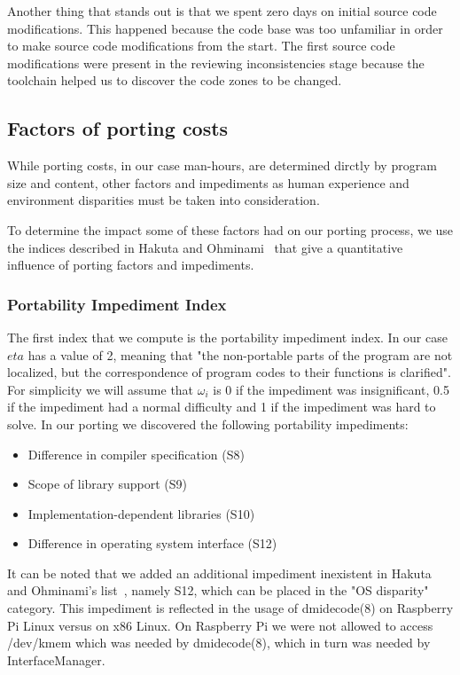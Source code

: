 Another thing that stands out is that we spent zero days on initial source code
modifications. This happened because the code base was too unfamiliar in order
to make source code modifications from the start. The first source code
modifications were present in the reviewing inconsistencies stage because the
toolchain helped us to discover the code zones to be changed.

\subsection{Factors of porting costs}

While porting costs, in our case man-hours, are determined dirctly by program
size and content, other factors and impediments as human experience and
environment disparities must be taken into consideration.

To determine the impact some of these factors had on our porting process, we
use the indices described in Hakuta and Ohminami~\cite{b2} that give
a quantitative influence of porting factors and impediments.

\subsubsection{Portability Impediment Index}

The first index that we compute is the portability impediment index.  In our
case $eta$ has a value of 2, meaning that "the non-portable parts of the program
are not localized, but the correspondence of program codes to their functions is
clarified". For simplicity we will assume that $\omega_i$ is 0 if the impediment
was insignificant, 0.5 if the impediment had a normal difficulty and 1 if the
impediment was hard to solve. In our porting we discovered the following
portability impediments:
\begin{itemize}
    \item Difference in compiler specification (S8)
    \item Scope of library support (S9)
    \item Implementation-dependent libraries (S10)
    \item Difference in operating system interface (S12)
\end{itemize}

It can be noted that we added an additional impediment inexistent in Hakuta and
Ohminami's list~\cite{b2}, namely S12, which can be placed in the "OS disparity"
category. This impediment is reflected in the usage of dmidecode(8) on Raspberry
Pi Linux versus on x86 Linux. On Raspberry Pi we were not allowed to access
/dev/kmem which was needed by dmidecode(8), which in turn was needed by
InterfaceManager.


